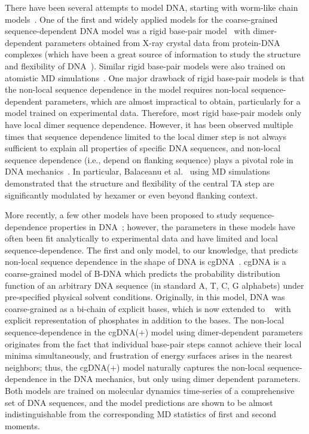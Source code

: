 There have been several attempts to model DNA, starting with worm-like chain models~\cite{kratky1949,shimada1980statistical}. 
One of the first and widely applied models for the coarse-grained sequence-dependent DNA model was a rigid base-pair model~\cite{xraydata} with dimer-dependent parameters obtained from X-ray crystal data from protein-DNA complexes (which have been a great source of information to study the structure and flexibility of DNA~\cite{neidle2021beyond}).
Similar rigid base-pair models were also trained on atomistic MD simulations~\cite{lankavs2003dna,gonzalez2001extracting}.
One major drawback of rigid base-pair models is that the non-local sequence dependence in the model requires non-local sequence-dependent parameters, which are almost impractical to obtain, particularly for a model trained on experimental data.
Therefore, most rigid base-pair models only have local dimer sequence dependence.
However, it has been observed multiple times that sequence dependence limited to the local dimer step is not always sufficient to explain all properties of specific DNA sequences, and non-local sequence dependence (i.e., depend on flanking sequence) plays a pivotal role in DNA mechanics~\cite{fujii2007sequence,perez2008towards,balaceanu2019modulation,lavery2010systematic,yanagi1991analysis,packer2000sequence,arauzo2005sequence}.
In particular, Balaceanu et al.~\cite{balaceanu2019modulation} using MD simulations demonstrated that the structure and flexibility of the central TA step are significantly modulated by hexamer or even beyond flanking context.

More recently, a few other models have been proposed to study sequence-dependence properties in DNA~\cite{ouldridge2011structural, chakraborty2018sequence,3spn,dnamartini}; however, the parameters in these models have often been fit analytically to experimental data and have limited and local sequence-dependence.
The first and only model, to our knowledge, that predicts non-local sequence dependence in the shape of DNA is cgDNA~\cite{petkevivciute2014cgdna,cgDNA1}. cgDNA is a coarse-grained model of B-DNA which predicts the probability distribution function of an arbitrary DNA sequence (in standard A, T, C, G alphabets) under pre-specified physical solvent conditions. 
Originally, in this model, DNA was coarse-grained as a bi-chain of explicit bases, which is now extended to ~\cite{patelithesis} with explicit representation of phosphates in addition to the bases.
The non-local sequence-dependence in the cgDNA($+$) model using dimer-dependent parameters originates from the fact that individual base-pair steps cannot achieve their local minima simultaneously, and frustration of energy surfaces arises in the nearest neighbors; thus, the cgDNA($+$) model naturally captures the non-local sequence-dependence in the DNA mechanics, but only using dimer dependent parameters.
Both models are trained on molecular dynamics time-series of a comprehensive set of DNA sequences, and the model predictions are shown to be almost indistinguishable from the corresponding MD statistics of first and second moments.


